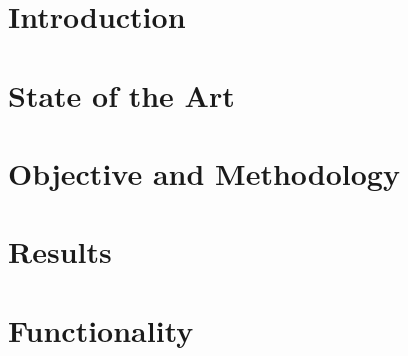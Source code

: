 \documentclass[12pt]{report}
\begin{document}
    
    
    \tableofcontents

    
    \chapter*{Introduction}
    

    \chapter*{State of the Art}
    

    \chapter*{Objective and Methodology}
    

    \chapter*{Results}
    

    \chapter*{Functionality}
    

    \printbibliography %
\end{document}
